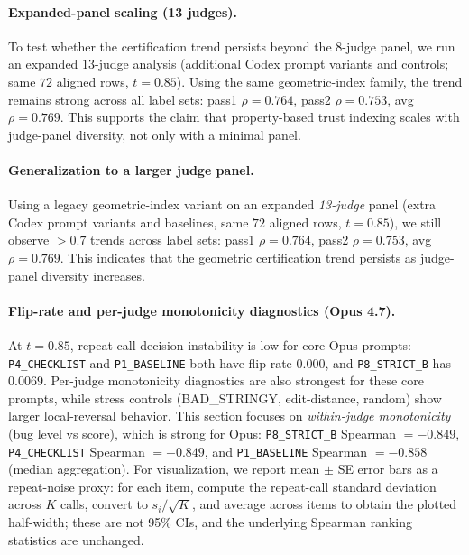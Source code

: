 \documentclass{article}
\begin{document}
\paragraph{Expanded-panel scaling (13 judges).}
To test whether the certification trend persists beyond the \(8\)-judge panel, we run an expanded \(13\)-judge analysis (additional Codex prompt variants and controls; same \(72\) aligned rows, \(t=0.85\)).
Using the same geometric-index family, the trend remains strong across all label sets:
pass1 \(\rho=0.764\), pass2 \(\rho=0.753\), avg \(\rho=0.769\).
This supports the claim that property-based trust indexing scales with judge-panel diversity, not only with a minimal panel.

\paragraph{Generalization to a larger judge panel.}
Using a legacy geometric-index variant on an expanded \emph{13-judge} panel (extra Codex prompt variants and baselines, same \(72\) aligned rows, \(t=0.85\)),
we still observe \(>0.7\) trends across label sets:
pass1 \(\rho=0.764\), pass2 \(\rho=0.753\), avg \(\rho=0.769\).
This indicates that the geometric certification trend persists as judge-panel diversity increases.

\paragraph{Flip-rate and per-judge monotonicity diagnostics (Opus 4.7).}
At \(t=0.85\), repeat-call decision instability is low for core Opus prompts:
\texttt{P4\_CHECKLIST} and \texttt{P1\_BASELINE} both have flip rate \(0.000\), and \texttt{P8\_STRICT\_B} has \(0.0069\).
Per-judge monotonicity diagnostics are also strongest for these core prompts, while stress controls (BAD\_STRINGY, edit-distance, random) show larger local-reversal behavior.
This section focuses on \emph{within-judge monotonicity} (bug level vs score), which is strong for Opus:
\texttt{P8\_STRICT\_B} Spearman \(=-0.849\), \texttt{P4\_CHECKLIST} Spearman \(=-0.849\), and \texttt{P1\_BASELINE} Spearman \(=-0.858\) (median aggregation).
For visualization, we report mean \(\pm\) SE error bars as a repeat-noise proxy: for each item, compute the repeat-call standard deviation across \(K\) calls, convert to \(s_i/\sqrt{K}\), and average across items to obtain the plotted half-width; these are not 95\% CIs, and the underlying Spearman ranking statistics are unchanged.
\end{document}
